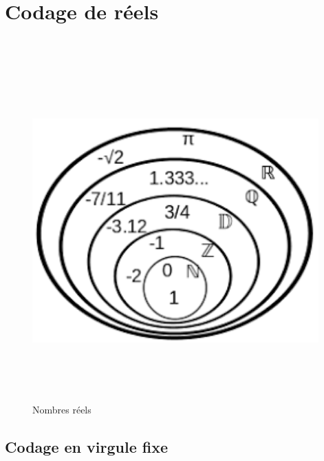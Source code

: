 \documentclass{article}
\begin{document}
\newpage
\section{Codage de r\'eels}
\begin{center}
~\newline
\begin{figure}[h]
\begin{center}
	\includegraphics[width=11cm,height=13cm]{illustration3.png}
	\caption[Illustration 3]{Nombres r\'eels}
	\label{ill3}
\end{center}
\end{figure}
\end{center}


\subsection{Codage en virgule fixe}
\end{document}
